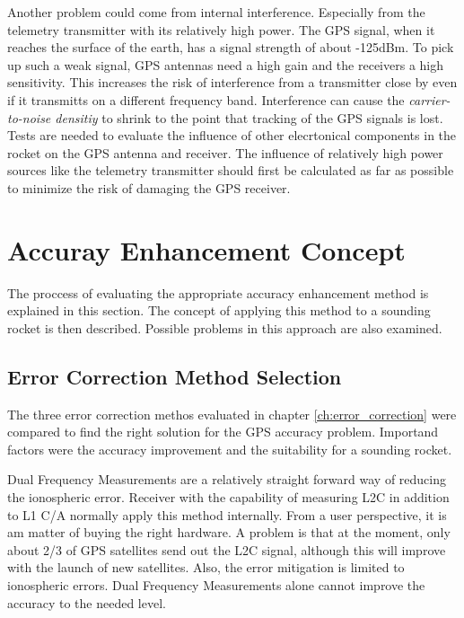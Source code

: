 Another problem could come from internal interference.
Especially from the telemetry transmitter with its relatively high power.
The GPS signal, when it reaches the surface of the earth, has a signal strength of about -125dBm.
To pick up such a weak signal, GPS antennas need a high gain and the receivers a high sensitivity.
This increases the risk of interference from a transmitter close by even if it transmitts on a different frequency band.
Interference can cause the \textit{carrier-to-noise densitiy} to shrink to the point that tracking of the GPS signals is lost.
Tests are needed to evaluate the influence of other elecrtonical components in the rocket on the GPS antenna and receiver.
The influence of relatively high power sources like the telemetry transmitter should first be calculated as far as possible to minimize the risk of damaging the GPS receiver.


\section{Accuray Enhancement Concept}

The proccess of evaluating the appropriate accuracy enhancement method is explained in this section.
The concept of applying this method to a sounding rocket is then described.
Possible problems in this approach are also examined.

\subsection{Error Correction Method Selection}

The three error correction methos evaluated in chapter \ref{ch:error_correction} were compared to find the right solution for the GPS accuracy problem.
Importand factors were the accuracy improvement and the suitability for a sounding rocket.

Dual Frequency Measurements are a relatively straight forward way of reducing the ionospheric error.
Receiver with the capability of measuring L2C in addition to L1 C/A normally apply this method internally.
From a user perspective, it is am matter of buying the right hardware.
A problem is that at the moment, only about 2/3 of GPS satellites send out the L2C signal, although this will improve with the launch of new satellites.
Also, the error mitigation is limited to ionospheric errors.
Dual Frequency Measurements alone cannot improve the accuracy to the needed level.

